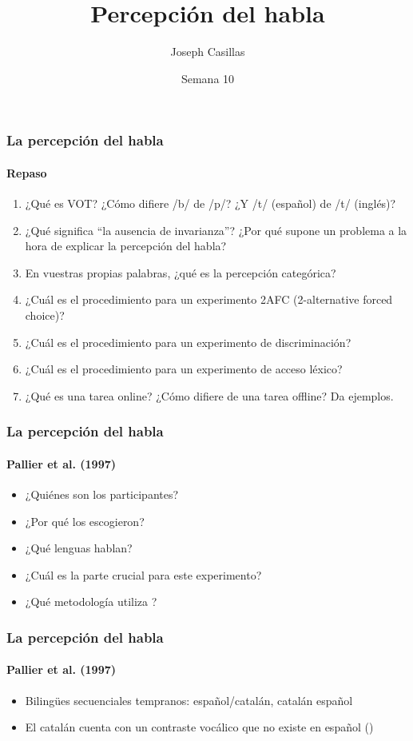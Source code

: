 \documentclass{beamer}
\title{Percepción del habla}
\author[Casillas]{Joseph Casillas}
\institute{Universidad de Arizona}
\date{Semana 10}
\begin{document}
\begin{frame}%
  \titlepage
\end{frame}

\begin{frame}
	\frametitle{La percepción del habla}
	\framesubtitle{Repaso}

	\begin{enumerate}
	\itemsep=.7em
		\item ¿Qué es VOT? ¿Cómo difiere /b/ de /p/? ¿Y /t/ (español) de /t/ (inglés)? 
		\item ¿Qué significa ``la ausencia de invarianza''? ¿Por qué supone un problema a la hora de explicar la percepción del habla?
		\item En vuestras propias palabras, ¿qué es la percepción categórica?
		\item ¿Cuál es el procedimiento para un experimento 2AFC (2-alternative forced choice)?
		\item ¿Cuál es el procedimiento para un experimento de discriminación?
		\item ¿Cuál es el procedimiento para un experimento de acceso léxico?
		\item ¿Qué es una tarea online? ¿Cómo difiere de una tarea offline? Da ejemplos. 
	\end{enumerate}
\end{frame}


\begin{frame}
	\frametitle{La percepción del habla}
	\framesubtitle{Pallier et al. (1997)}
	
	\begin{itemize}
		\item ¿Quiénes son los participantes? 
		\item ¿Por qué los escogieron? 
		\item ¿Qué lenguas hablan? 
		\item ¿Cuál es la parte crucial para este experimento?
		\item ¿Qué metodología utiliza \cite{Pallier1997a}?
	\end{itemize}
\end{frame}

\begin{frame}
	\frametitle{La percepción del habla}
	\framesubtitle{Pallier et al. (1997)}
	
	\begin{itemize}
		\item Bilingües secuenciales tempranos: español/catalán, catalán español
		\item El catalán cuenta con un contraste vocálico que no existe en español ()
	\end{itemize}
\end{frame}
\end{document}
